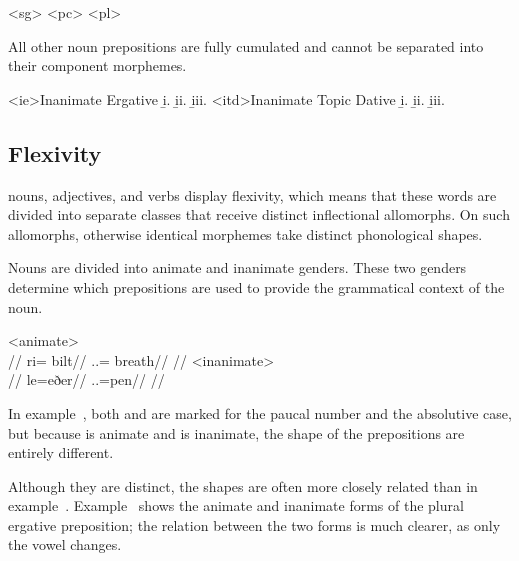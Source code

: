 	\a<sg>  
	\a<pc>  
	\a<pl>  
\xe

All other noun prepositions are fully cumulated and cannot be separated into their component morphemes.

	\a<ie>Inanimate Ergative
	\beginsubsub
		\b{i.}  
		\b{ii.}  
		\b{iii.}  
	\endsubsub
	\a<itd>Inanimate Topic Dative
	\beginsubsub
		\b{i.}  
		\b{ii.}  
		\b{iii.}  
	\endsubsub
\xe


\subsection{Flexivity}
\label{subsec:tvk-flexivity}

\langtvk{} nouns, adjectives, and verbs display flexivity, which means that these words are divided into separate classes that receive distinct inflectional allomorphs. On such allomorphs, otherwise identical morphemes take distinct phonological shapes.

Nouns are divided into animate and inanimate genders. These two genders determine which prepositions are used to provide the grammatical context of the noun.

	\a<animate>\begingl
		\glpreamble{}\\
		//
		\gla ri= bilt//
		\glb \An.\Pc.\Abs= breath//
		\glft{}//
	\endgl
	\a<inanimate>\begingl
		\glpreamble{}\\
		//
		\gla le=eðer//
		\glb \In.\Pc.\Abs=pen//
		\glft{}//
	\endgl
\xe

In example~, both  and  are marked for the paucal number and the absolutive case, but because  is animate and  is inanimate, the shape of the prepositions are entirely different.

Although they are distinct, the shapes are often more closely related than in example~. Example~ shows the animate and inanimate forms of the plural ergative preposition; the relation between the two forms is much clearer, as only the vowel changes.


